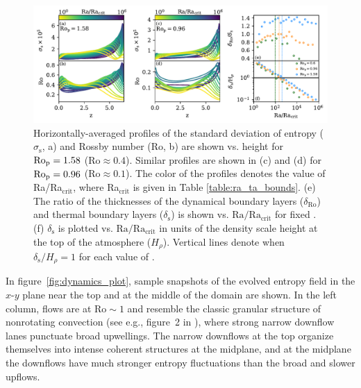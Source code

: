 \begin{figure}[ht!]
    \includegraphics[width=\textwidth]{./figs/boundary_layers.pdf}
    \caption[Boundary layer evolution on fixed Predictive Rossby paths]
	{Horizontally-averaged profiles of the standard deviation of entropy ($\sigma_{\text{s}}$, a) and Rossby number (Ro, b) 
    are shown vs. height for $\text{Ro}_{\text{p}} = 1.58$ ($\text{Ro} \approx 0.4$). 
    Similar profiles are shown in (c) and (d) for $\text{Ro}_{\text{p}} = 0.96$ ($\text{Ro} \approx 0.1$). The color of the profiles
    denotes the value of Ra/Ra$_{\text{crit}}$, where Ra$_\text{crit}$ is given in Table \ref{table:ra_ta_bounds}.
    (e) The ratio of the thicknesses of the dynamical boundary layers ($\delta_{\text{Ro}}$) and 
    thermal boundary layers ($\delta_{\text{s}}$) is shown vs. $\text{Ra}/\text{Ra}_{\text{crit}}$ for fixed \pro.
	(f) $\delta_{\text{s}}$ is plotted vs. $\text{Ra}/\text{Ra}_{\text{crit}}$ in units of the density
	scale height at the top of the atmosphere ($H_\rho$). Vertical lines denote when $\delta_\text{s}/H_\rho = 1$
	for each value of \pro.
    \label{fig:profiles_and_bls} }
\end{figure}

In figure~\ref{fig:dynamics_plot}, sample snapshots of the evolved entropy field 
in the $x$-$y$ plane near the top and at the middle of the domain are shown. 
In the left column, flows are at $\text{Ro} \sim 1$ and resemble the classic granular structure 
of nonrotating convection (see e.g., figure~2 in \AB), where strong narrow downflow lanes 
punctuate broad upwellings. The narrow downflows at the top organize themselves into intense
coherent structures at the midplane, and at the midplane the downflows have much stronger
entropy fluctuations than the broad and slower upflows. 

